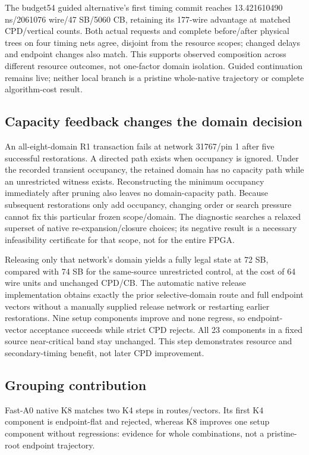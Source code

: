 \documentclass[conference,10pt]{IEEEtran}
\begin{document}
The budget54 guided alternative's first timing commit reaches 13.421610490 ns/2061076 wire/47 SB/5060 CB, retaining its 177-wire advantage at matched CPD/vertical counts. Both actual requests and complete before/after physical trees on four timing nets agree, disjoint from the resource scopes; changed delays and endpoint changes also match. This supports observed composition across different resource outcomes, not one-factor domain isolation. Guided continuation remains live; neither local branch is a pristine whole-native trajectory or complete algorithm-cost result.

\subsection{Capacity feedback changes the domain decision}
An all-eight-domain R1 transaction fails at network 31767/pin 1 after five successful restorations. A directed path exists when occupancy is ignored. Under the recorded transient occupancy, the retained domain has no capacity path while an unrestricted witness exists. Reconstructing the minimum occupancy immediately after pruning also leaves no domain-capacity path. Because subsequent restorations only add occupancy, changing order or search pressure cannot fix this particular frozen scope/domain. The diagnostic searches a relaxed superset of native re-expansion/closure choices; its negative result is a necessary infeasibility certificate for that scope, not for the entire FPGA.

Releasing only that network's domain yields a fully legal state at 72 SB, compared with 74 SB for the same-source unrestricted control, at the cost of 64 wire units and unchanged CPD/CB. The automatic native release implementation obtains exactly the prior selective-domain route and full endpoint vectors without a manually supplied release network or restarting earlier restorations. Nine setup components improve and none regress, so endpoint-vector acceptance succeeds while strict CPD rejects. All 23 components in a fixed source near-critical band stay unchanged. This step demonstrates resource and secondary-timing benefit, not later CPD improvement.

\subsection{Grouping contribution}
Fast-A0 native K8 matches two K4 steps in routes/vectors. Its first K4 component is endpoint-flat and rejected, whereas K8 improves one setup component without regressions: evidence for whole combinations, not a pristine-root endpoint trajectory.
\end{document}
